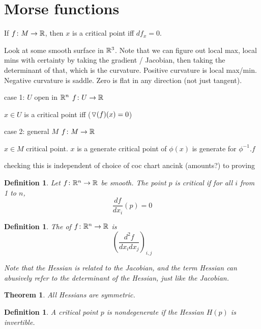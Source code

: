 \documentclass[11pt]{amsbook}
\newenvironment{dateenv}{
	\vspace{1em}
}{
	\vspace{1em}
}
\newcommand{\mydate}[4]{
	\newdate{#1}{#2}{#3}{#4}
	\begin{dateenv}
		\hfill\displaydate{#1}
	\end{dateenv}
}
\theoremstyle{mystyle} %
\newtheorem{thrm}[thm]{Theorem}
\newtheorem{defi}[thm]{Definition}
\numberwithin{thm}{section}
\begin{document}
\section{Morse functions}

\begin{rmk}
	If $f \colon M \to {\mathbb R}$, then $x$ is a critical point iff $df_x = 0$.
\end{rmk}

\begin{example}
	Look at some smooth surface in ${\mathbb R}^3$.
	Note that we can figure out local max, local mins with certainty by taking the gradient / Jacobian, then taking the determinant of that, which is the curvature.  Positive curvature is local max/min.  Negative curvature is saddle.  Zero is flat in any direction (not just tangent).

		case 1:
			$U$ open in ${\mathbb R}^n$
			$f\colon U \to {\mathbb R}$

			$x \in U$ is a critical point iff ($\triangledown(f)(x) = 0$)

		case 2:
			general $M$
			$f\colon M \to {\mathbb R}$

			$x \in M$ critical point.  $x$ is a generate critical point of $\phi(x)$ is generate for $\phi^{-1}.f$


		checking this is independent of choice of coc chart ancink (amounts?) to proving
\end{example}

\mydate{d19}{30}{11}{2016}

\begin{defi}
	Let $f \colon {\mathbb R}^n \to {\mathbb R}$ be smooth.  The point $p$ is \emph{critical} if for all $i$ from 1 to $n$, $$\frac{df}{dx_i}(p) = 0$$
\end{defi}

\begin{defi}
	The  of $f\colon {\mathbb R}^n \to {\mathbb R}$ is $$\left( \frac{d^2f}{dx_i dx_j} \right)_{i,j}$$

	Note that the Hessian is related to the Jacobian, and the term Hessian can abusively refer to the determinant of the Hessian, just like the Jacobian.
\end{defi}
\begin{thrm}
	All Hessians are symmetric.
\end{thrm}

\begin{defi}
	A critical point $p$ is \emph{nondegenerate} if the Hessian $H(p)$ is invertible.
\end{defi}
\end{document}

